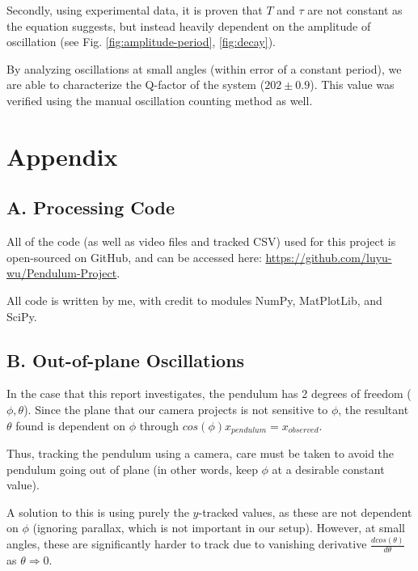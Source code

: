 \documentclass[prl,twocolumn,amsmath,amssymb,superscriptaddress]{revtex4-2}
\begin{document}
Secondly, using experimental data, it is proven that $T$ and $\tau$ are not constant as the equation suggests, but instead heavily dependent on the amplitude of oscillation (see Fig. \ref{fig:amplitude-period}, \ref{fig:decay}).

By analyzing oscillations at small angles (within error of a constant period), we are able to characterize the Q-factor of the system ($202\pm0.9$). This value was verified using the manual oscillation counting method as well.


\onecolumngrid

\newpage
\section{Appendix}

\subsection{A. Processing Code}

All of the code (as well as video files and tracked CSV) used for this project is open-sourced on GitHub, and can be accessed here: \href{https://github.com/luyu-wu/Pendulum-Project}{https://github.com/luyu-wu/Pendulum-Project}.

All code is written by me, with credit to modules NumPy, MatPlotLib, and SciPy.

\subsection{B. Out-of-plane Oscillations}

In the case that this report investigates, the pendulum has 2 degrees of freedom ($\phi, \theta$). Since the plane that our camera projects is not sensitive to $\phi$, the resultant $\theta$ found is dependent on $\phi$ through $cos(\phi)x_{pendulum} = x_{observed}$.

Thus, tracking the pendulum using a camera, care must be taken to avoid the pendulum going out of plane (in other words, keep $\phi$ at a desirable constant value).

A solution to this is using purely the $y$-tracked values, as these are not dependent on $\phi$ (ignoring parallax, which is not important in our setup).
However, at small angles, these are significantly harder to track due to vanishing derivative $\frac{dcos(\theta)}{d\theta}$ as $\theta \Rightarrow 0$.
\end{document}

